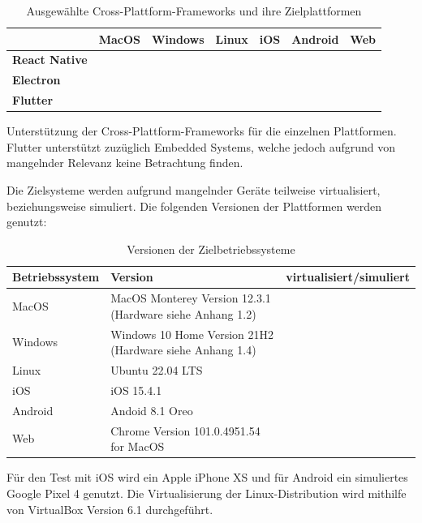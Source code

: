 \documentclass[a4paper]{scrartcl}
\newcommand{\xmark}{\ding{55}}
\begin{document}
\begin{table}[H]
 	\centering
 	\caption{Ausgewählte Cross-Plattform-Frameworks und ihre Zielplattformen}
 	\begin{center}
 		\begin{tabular}{| l || c | c | c | c | c | c |}
 			\hline
 			\textbf{} & \textbf{MacOS} & \textbf{Windows} & \textbf{Linux} & \textbf{iOS} & \textbf{Android} & \textbf{Web} \\
 			\hline \hline
			\textbf{React Native} & \xmark & \xmark & \xmark & \Checkmark & \Checkmark & \xmark \\
 			\hline
 			\textbf{Electron} & \Checkmark & \Checkmark & \Checkmark & \xmark & \xmark & \xmark \\
 			\hline
 			\textbf{Flutter} & \Checkmark & \Checkmark & \Checkmark & \Checkmark & \Checkmark & \Checkmark \\
 			\hline
 		\end{tabular}
 	\end{center}
	Unterstützung der Cross-Plattform-Frameworks für die einzelnen Plattformen. Flutter unterstützt zuzüglich Embedded Systems, welche jedoch aufgrund von mangelnder Relevanz keine Betrachtung finden.
 \end{table}
 
 Die Zielsysteme werden aufgrund mangelnder Geräte teilweise virtualisiert, beziehungsweise simuliert. Die folgenden Versionen der Plattformen werden genutzt:
 
\begin{table}[H]
 	\centering
 	\caption{Versionen der Zielbetriebssysteme}
 	\begin{center}
 		\begin{tabularx}{\linewidth}{| Y | Y | c |}
 			\hline
 			\textbf{Betriebssystem} & \textbf{Version} & \textbf{virtualisiert/simuliert} \\
 			\hline \hline
			MacOS & MacOS Monterey Version 12.3.1 (Hardware siehe Anhang 1.2) & \xmark \\
 			\hline
 			Windows & Windows 10 Home Version 21H2 (Hardware siehe Anhang 1.4) & \xmark \\
 			\hline
 			Linux & Ubuntu 22.04 LTS & \Checkmark \\
 			\hline
 			iOS & iOS 15.4.1 & \xmark \\
 			\hline
 			Android & Andoid 8.1 Oreo & \Checkmark \\
 			\hline
 			Web & Chrome Version 101.0.4951.54 for MacOS & \xmark \\
 			\hline
 		\end{tabularx}
 	\end{center}
	Für den Test mit iOS wird ein Apple iPhone XS und für Android ein simuliertes Google Pixel 4 genutzt. Die Virtualisierung der Linux-Distribution wird mithilfe von VirtualBox Version 6.1 durchgeführt.
\end{table}
 
\end{document}
